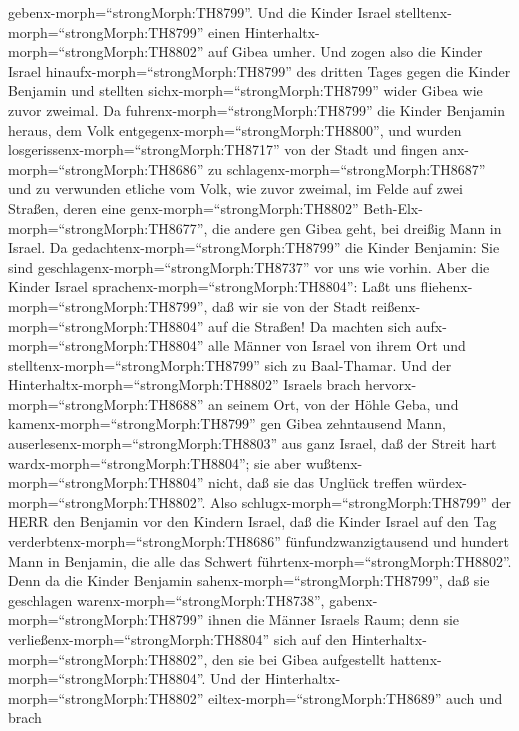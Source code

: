 gebenx-morph=``strongMorph:TH8799''.  Und die Kinder Israel
stelltenx-morph=``strongMorph:TH8799'' einen
Hinterhaltx-morph=``strongMorph:TH8802'' auf Gibea umher. 
Und zogen also die Kinder Israel hinaufx-morph=``strongMorph:TH8799''
des dritten Tages gegen die Kinder Benjamin und stellten
sichx-morph=``strongMorph:TH8799'' wider Gibea wie zuvor zweimal.
 Da fuhrenx-morph=``strongMorph:TH8799'' die Kinder
Benjamin heraus, dem Volk entgegenx-morph=``strongMorph:TH8800'', und
wurden losgerissenx-morph=``strongMorph:TH8717'' von der Stadt und
fingen anx-morph=``strongMorph:TH8686'' zu
schlagenx-morph=``strongMorph:TH8687'' und zu verwunden etliche vom
Volk, wie zuvor zweimal, im Felde auf zwei Straßen, deren eine
genx-morph=``strongMorph:TH8802'' Beth-Elx-morph=``strongMorph:TH8677'',
die andere gen Gibea geht, bei dreißig Mann in Israel.  Da
gedachtenx-morph=``strongMorph:TH8799'' die Kinder Benjamin: Sie sind
geschlagenx-morph=``strongMorph:TH8737'' vor uns wie vorhin. Aber die
Kinder Israel sprachenx-morph=``strongMorph:TH8804'': Laßt uns
fliehenx-morph=``strongMorph:TH8799'', daß wir sie von der Stadt
reißenx-morph=``strongMorph:TH8804'' auf die Straßen!  Da
machten sich aufx-morph=``strongMorph:TH8804'' alle Männer von Israel
von ihrem Ort und stelltenx-morph=``strongMorph:TH8799'' sich zu
Baal-Thamar. Und der Hinterhaltx-morph=``strongMorph:TH8802'' Israels
brach hervorx-morph=``strongMorph:TH8688'' an seinem Ort, von der Höhle
Geba,  und kamenx-morph=``strongMorph:TH8799'' gen Gibea
zehntausend Mann, auserlesenx-morph=``strongMorph:TH8803'' aus ganz
Israel, daß der Streit hart wardx-morph=``strongMorph:TH8804''; sie aber
wußtenx-morph=``strongMorph:TH8804'' nicht, daß sie das Unglück treffen
würdex-morph=``strongMorph:TH8802''.  Also
schlugx-morph=``strongMorph:TH8799'' der HERR den Benjamin vor den
Kindern Israel, daß die Kinder Israel auf den Tag
verderbtenx-morph=``strongMorph:TH8686'' fünfundzwanzigtausend und
hundert Mann in Benjamin, die alle das Schwert
führtenx-morph=``strongMorph:TH8802''.  Denn da die Kinder
Benjamin sahenx-morph=``strongMorph:TH8799'', daß sie geschlagen
warenx-morph=``strongMorph:TH8738'', gabenx-morph=``strongMorph:TH8799''
ihnen die Männer Israels Raum; denn sie
verließenx-morph=``strongMorph:TH8804'' sich auf den
Hinterhaltx-morph=``strongMorph:TH8802'', den sie bei Gibea aufgestellt
hattenx-morph=``strongMorph:TH8804''.  Und der
Hinterhaltx-morph=``strongMorph:TH8802''
eiltex-morph=``strongMorph:TH8689'' auch und brach
